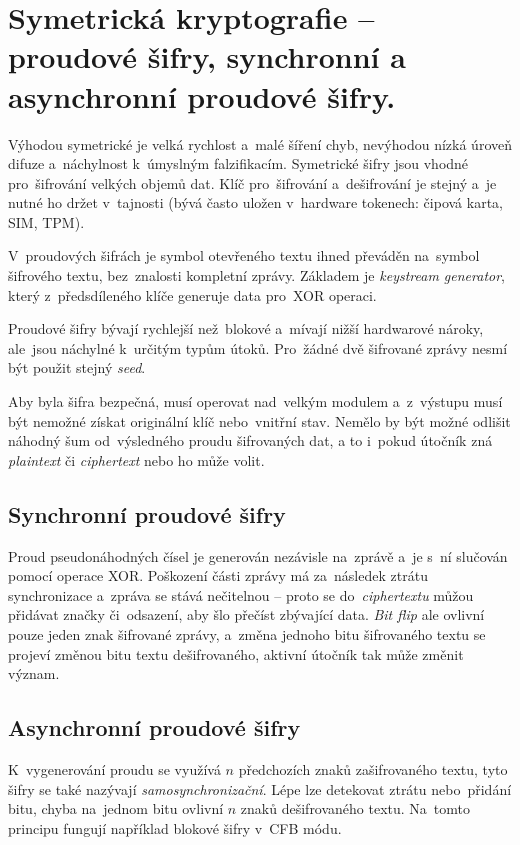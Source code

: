 \clearpage
\section{Symetrická kryptografie -- proudové šifry, synchronní a asynchronní proudové šifry.}
\label{question-4}

Výhodou symetrické je velká rychlost a~malé šíření chyb, nevýhodou nízká úroveň difuze a~náchylnost k~úmyslným falzifikacím. Symetrické šifry jsou vhodné pro~šifrování velkých objemů dat. Klíč pro~šifrování a~dešifrování je stejný a~je nutné ho držet v~tajnosti (bývá často uložen v~hardware tokenech: čipová karta, SIM, TPM).

V~proudových šifrách je symbol otevřeného textu ihned převáděn na~symbol šifrového textu, bez~znalosti kompletní zprávy. Základem je \emph{keystream generator}, který z~předsdíleného klíče generuje data pro~XOR operaci.

Proudové šifry bývají rychlejší než~blokové a~mívají nižší hardwarové nároky, ale~jsou náchylné k~určitým typům útoků. Pro~žádné dvě šifrované zprávy nesmí být použit stejný \emph{seed}.

Aby byla šifra bezpečná, musí operovat nad~velkým modulem a~z~výstupu musí být nemožné získat originální klíč nebo~vnitřní stav. Nemělo by být možné odlišit náhodný šum od~výsledného proudu šifrovaných dat, a to i~pokud útočník zná \emph{plaintext} či \emph{ciphertext} nebo ho může volit.

\subsection{Synchronní proudové šifry}

Proud pseudonáhodných čísel je generován nezávisle na~zprávě a~je s~ní slučován pomocí operace XOR. Poškození části zprávy má za~následek ztrátu synchronizace a~zpráva se stává nečitelnou -- proto se do~\emph{ciphertextu} můžou přidávat značky či~odsazení, aby šlo přečíst zbývající data. \emph{Bit flip} ale ovlivní pouze jeden znak šifrované zprávy, a~změna jednoho bitu šifrovaného textu se projeví změnou bitu textu dešifrovaného, aktivní útočník tak může změnit význam.

\subsection{Asynchronní proudové šifry}

K~vygenerování proudu se využívá $n$ předchozích znaků zašifrovaného textu, tyto šifry se také nazývají \emph{samosynchronizační}. Lépe lze detekovat ztrátu nebo~přidání bitu, chyba na~jednom bitu ovlivní $n$ znaků dešifrovaného textu. Na~tomto principu fungují například blokové šifry v~CFB módu.

